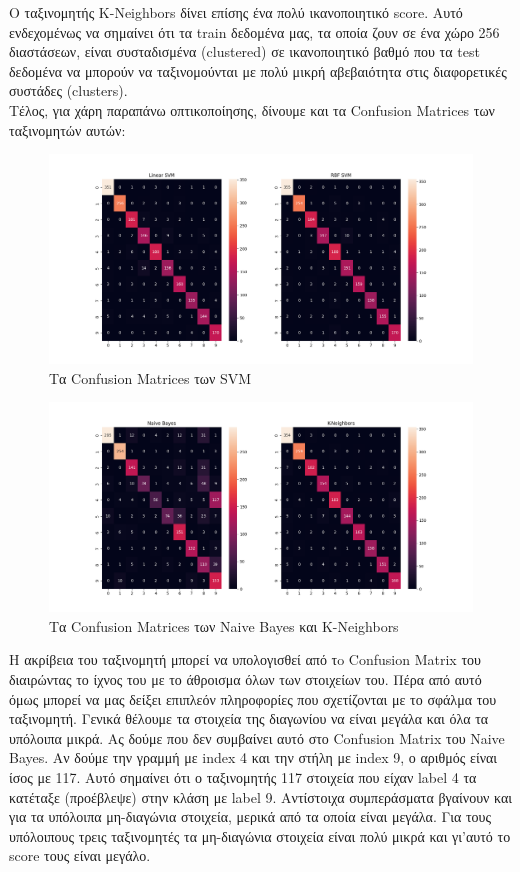 \documentclass[11pt]{article} %
\begin{document}
Ο ταξινομητής Κ-Neighbors δίνει επίσης ένα πολύ ικανοποιητικό score. Αυτό ενδεχομένως να σημαίνει ότι τα train δεδομένα μας, τα οποία ζουν σε ένα χώρο 256 διαστάσεων, είναι συσταδισμένα (clustered) σε ικανοποιητικό βαθμό που τα test δεδομένα να μπορούν να ταξινομούνται με πολύ μικρή αβεβαιότητα στις διαφορετικές συστάδες (clusters).\\

Τέλος, για χάρη παραπάνω οπτικοποίησης, δίνουμε και τα Confusion Matrices των ταξινομητών αυτών:\\

\begin{figure}[H]
    \centering
    \includegraphics[width=1.2\textwidth]{plots/cm_svms.png}
    \caption{Τα Confusion Matrices των SVM}
    \label{fig:cm_svm}
\end{figure}

\begin{figure}[H]
    \centering
    \includegraphics[width=1.2\textwidth]{plots/cm_k_n.png}
    \caption{Τα Confusion Matrices των Naive Bayes και K-Neighbors}
    \label{fig:cm_kn}
\end{figure}

Η ακρίβεια του ταξινομητή μπορεί να υπολογισθεί από τo Confusion Matrix του διαιρώντας το ίχνος του με το άθροισμα όλων των στοιχείων του. Πέρα από αυτό όμως μπορεί να μας δείξει επιπλεόν πληροφορίες που σχετίζονται με το σφάλμα του ταξινομητή. Γενικά θέλουμε τα στοιχεία της διαγωνίου να είναι μεγάλα και όλα τα υπόλοιπα μικρά. Ας δούμε που δεν συμβαίνει αυτό στο Confusion Matrix του Naive Bayes. Αν δούμε την γραμμή με index 4 και την στήλη με index 9, ο αριθμός είναι ίσος με 117. Αυτό σημαίνει ότι ο ταξινομητής 117 στοιχεία που είχαν label 4 τα κατέταξε (προέβλεψε) στην κλάση με label 9. Αντίστοιχα συμπεράσματα βγαίνουν και για τα υπόλοιπα μη-διαγώνια στοιχεία, μερικά από τα οποία είναι μεγάλα. Για τους υπόλοιπους τρεις ταξινομητές τα μη-διαγώνια στοιχεία είναι πολύ μικρά και γι'αυτό το score τους είναι μεγάλο.\\
\end{document}
